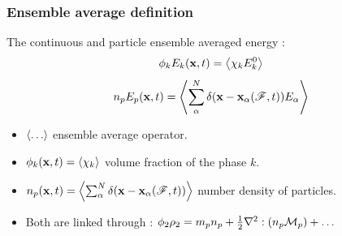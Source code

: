 \documentclass{sintefbeamer}
\begin{document}
\begin{frame}
  \frametitle{Ensemble average definition}
The continuous and particle ensemble  averaged energy : 
\begin{equation}
  \phi_k E_k (\textbf{x},t) = \left<\chi_k E_k^0\right>
  \label{eq:1_avg}
\end{equation}
\begin{equation}
  n_p E_p(\textbf{x},t) = \left<\sum_\alpha^N \delta(\textbf{x} - \textbf{x}_\alpha(\mathscr{F},t)) E_\alpha\right>
  \label{eq:p_avg}
\end{equation}
\begin{itemize}
  \item $\left<\ldots\right>$ ensemble average operator. 
  \item 
  $\phi_k (\textbf{x},t) = \left<\chi_k \right>$ volume fraction of the phase $k$. 
  \item $n_p (\textbf{x},t) = \left<\sum_\alpha^N \delta(\textbf{x} - \textbf{x}_\alpha(\mathscr{F},t))\right>$ number density of particles. 
  \item  Both are linked through :   $\phi_2 \rho_2= m_p n_p + \frac{1}{2}\mathbf{\nabla}^2 : (n_p\mathcal{M}_p)+\ldots$
\end{itemize}
\end{frame}
\end{document}
